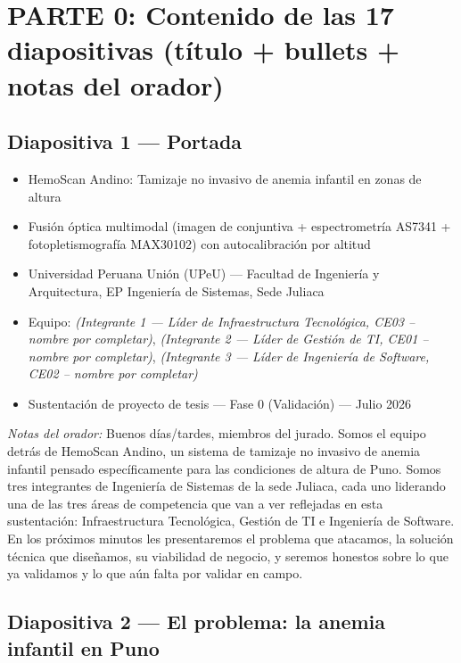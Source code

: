 \documentclass[11pt,a4paper]{article}
\providecommand{\tightlist}{%
  \setlength{\itemsep}{0pt}\setlength{\parskip}{0pt}}
\begin{document}
\section{PARTE 0: Contenido de las 17 diapositivas (título + bullets + notas del orador)}\label{parte-0-contenido-de-las-17-diapositivas-tuxedtulo-bullets-notas-del-orador}

\subsection{Diapositiva 1 --- Portada}\label{diapositiva-1-portada}

\begin{itemize}
\tightlist
\item
  HemoScan Andino: Tamizaje no invasivo de anemia infantil en zonas de altura
\item
  Fusión óptica multimodal (imagen de conjuntiva + espectrometría AS7341 + fotopletismografía MAX30102) con autocalibración por altitud
\item
  Universidad Peruana Unión (UPeU) --- Facultad de Ingeniería y Arquitectura, EP Ingeniería de Sistemas, Sede Juliaca
\item
  Equipo: \textit{(Integrante 1 --- Líder de Infraestructura Tecnológica, CE03 -- nombre por completar)}, \textit{(Integrante 2 --- Líder de Gestión de TI, CE01 -- nombre por completar)}, \textit{(Integrante 3 --- Líder de Ingeniería de Software, CE02 -- nombre por completar)}
\item
  Sustentación de proyecto de tesis --- Fase 0 (Validación) --- Julio 2026
\end{itemize}

\emph{Notas del orador:} Buenos días/tardes, miembros del jurado. Somos el equipo detrás de HemoScan Andino, un sistema de tamizaje no invasivo de anemia infantil pensado específicamente para las condiciones de altura de Puno. Somos tres integrantes de Ingeniería de Sistemas de la sede Juliaca, cada uno liderando una de las tres áreas de competencia que van a ver reflejadas en esta sustentación: Infraestructura Tecnológica, Gestión de TI e Ingeniería de Software. En los próximos minutos les presentaremos el problema que atacamos, la solución técnica que diseñamos, su viabilidad de negocio, y seremos honestos sobre lo que ya validamos y lo que aún falta por validar en campo.

\subsection{Diapositiva 2 --- El problema: la anemia infantil en Puno}\label{diapositiva-2-el-problema-la-anemia-infantil-en-puno}
\end{document}
